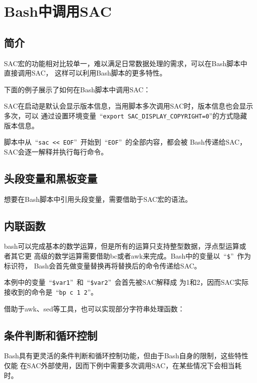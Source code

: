\section{Bash中调用SAC}
\label{sec:sac-bash}

\subsection{简介}
SAC宏的功能相对比较单一，难以满足日常数据处理的需求，可以在Bash脚本中直接调用SAC，
这样可以利用Bash脚本的更多特性。

下面的例子展示了如何在Bash脚本中调用SAC：


SAC在启动是默认会显示版本信息，当用脚本多次调用SAC时，版本信息也会显示多次，可以
通过设置环境变量~``\lstinline{export SAC_DISPLAY_COPYRIGHT=0}''的方式隐藏版本信息。

脚本中从~``\lstinline{sac << EOF}''~开始到~``\lstinline{EOF}''~的全部内容，都会被
Bash传递给SAC，SAC会逐一解释并执行每行命令。

\subsection{头段变量和黑板变量}
想要在Bash脚本中引用头段变量，需要借助于SAC宏的语法。


\subsection{内联函数}
bash可以完成基本的数学运算，但是所有的运算只支持整型数据，浮点型运算或者其它更
高级的数学运算需要借助bc或者awk来完成。Bash中的变量以~``\lstinline{$}''~作为标识符，
Bash会首先做变量替换再将替换后的命令传递给SAC。

本例中的变量~``\lstinline{$var1}''~和~``\lstinline{$var2}''~会首先被SAC解释成
为1和2，因而SAC实际接收到的命令是~``\lstinline{bp c 1 2}''。

借助于awk、sed等工具，也可以实现部分字符串处理函数：


\subsection{条件判断和循环控制}
Bash具有更灵活的条件判断和循环控制功能，但由于Bash自身的限制，这些特性仅能
在SAC外部使用，因而下例中需要多次调用SAC，在某些情况下会相当耗时。

